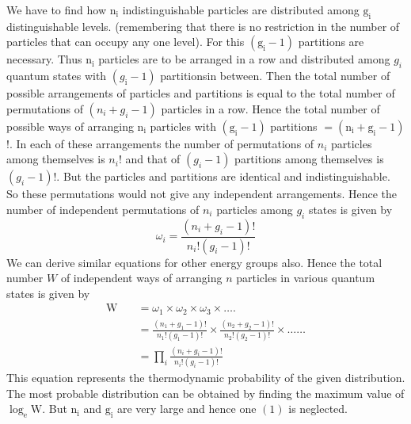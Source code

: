  We have to find how $\mathrm{n}_{\mathrm{i}}$ indistinguishable particles are distributed among $\mathrm{g}_{\mathrm{i}}$ distinguishable levels. (remembering that there is no restriction in the number of particles that can occupy any one level). For this $\left(\mathrm{g}_{\mathrm{i}}-1\right)$ partitions are necessary. Thus $\mathrm{n}_{\mathrm{i}}$ particles are to be arranged in a row and distributed among $g_{i}$ quantum states with $\left(g_{\mathrm{i}}-1\right)$ partitionsin between. Then the total number of possible arrangements of particles and partitions is equal to the total number of permutations of $\left(n_{i}+g_{i}-1\right)$ particles in a row. Hence the total number of possible ways of arranging $\mathrm{n}_{\mathrm{i}}$ particles with $\left(\mathrm{g}_{\mathrm{i}}-1\right)$ partitions $=\left(\mathrm{n}_{\mathrm{i}}+\mathrm{g}_{\mathrm{i}}-1\right)$ !. In each of these arrangements the number of permutations of $n_{i}$ particles among themselves is $n_{i} !$ and that of $\left(g_{i}-1\right)$ partitions among themselves is $\left(g_{i}-1\right) !$. But the particles and partitions are identical and indistinguishable. So these permutations would not give any independent arrangements. Hence the number of independent permutations of $n_{i}$ particles among $g_{i}$ states is given by
 $$\omega_{i}=\frac{\left(n_{i}+g_{i}-1\right) !}{n_{i} !\left(g_{i}-1\right) !}$$
We can derive similar equations for other energy groups also. Hence the total number $W$ of independent ways of arranging $n$ particles in various quantum states is given by
\begin{align*}
\mathrm{W} \quad&=\omega_{1} \times \omega_{2} \times \omega_{3} \times \ldots .\\
&=\frac{\left(n_{1}+g_{1}-1\right) !}{n_{1} !\left(g_{1}-1\right) !} \times \frac{\left(n_{2}+g_{2}-1\right) !}{n_{2} !\left(g_{2}-1\right) !} \times \ldots \ldots\\
&=\prod_{i} \frac{\left(n_{i}+g_{i}-1\right) !}{n_{i} !\left(g_{i}-1\right) !}
\end{align*}
This equation represents the thermodynamic probability of the given distribution. The most probable distribution can be obtained by finding the maximum value of $\log _{\mathrm{e}} \mathrm{W}$. But $\mathrm{n}_{\mathrm{i}}$ and $\mathrm{g}_{\mathrm{i}}$ are very large and hence one $(1)$ is neglected.
